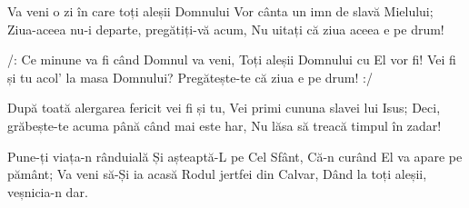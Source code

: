 \beginverse
Va veni o zi în care toți aleșii Domnului
Vor cânta un imn de slavă Mielului;
Ziua-aceea nu-i departe, pregătiți-vă acum,
Nu uitați că ziua aceea e pe drum!
\endverse

\beginchorus
/: Ce minune va fi când Domnul va veni,
Toți aleșii Domnului cu El vor fi!
Vei fi și tu acol’ la masa Domnului?
Pregătește-te că ziua e pe drum! :/
\endchorus

\beginverse
După toată alergarea fericit vei fi și tu,
Vei primi cununa slavei lui Isus;
Deci, grăbește-te acuma până când mai este har,
Nu lăsa să treacă timpul în zadar!
\endverse

\beginverse
Pune-ți viața-n rânduială
Și așteaptă-L pe Cel Sfânt,
Că-n curând El va apare pe pământ;
Va veni să-Și ia acasă
Rodul jertfei din Calvar,
Dând la toți aleșii, veșnicia-n dar.
\endverse
\endsong